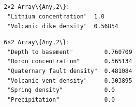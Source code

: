 \documentclass[11pt]{article}
\begin{document}
    \begin{center}
    \end{center}
    { \hspace*{\fill} \\}
    
    \begin{Verbatim}[commandchars=\\\{\}]

    \end{Verbatim}

    \begin{center}
    \end{center}
    { \hspace*{\fill} \\}
    
    \begin{center}
    \end{center}
    { \hspace*{\fill} \\}
    
    \begin{Verbatim}[commandchars=\\\{\}]

    \end{Verbatim}

    \begin{center}
    \end{center}
    { \hspace*{\fill} \\}
    
    
    \begin{Verbatim}[commandchars=\\\{\}]
2×2 Array\{Any,2\}:
 "Lithium concentration"  1.0
 "Volcanic dike density"  0.56854
    \end{Verbatim}

    
    
    \begin{Verbatim}[commandchars=\\\{\}]
6×2 Array\{Any,2\}:
 "Depth to basement"         0.760709
 "Boron concentration"       0.565134
 "Quaternary fault density"  0.481084
 "Volcanic vent density"     0.303895
 "Spring density"            0.0
 "Precipitation"             0.0
    \end{Verbatim}
\end{document}
